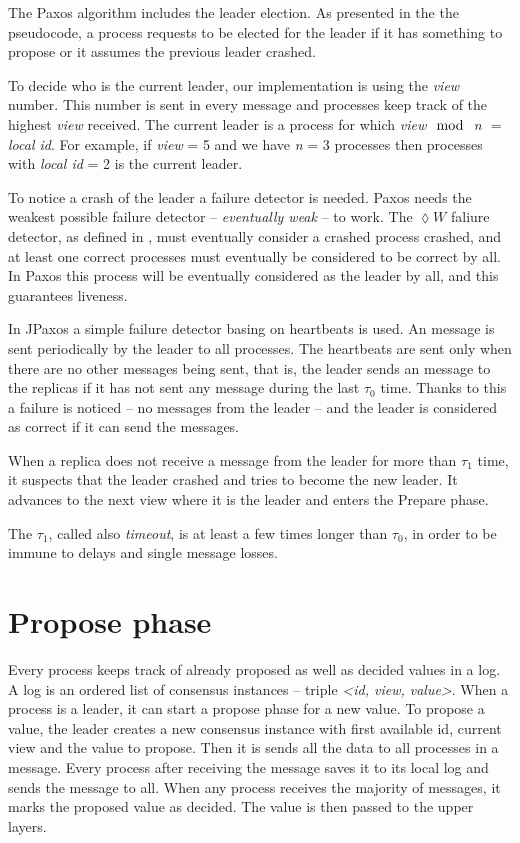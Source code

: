 The Paxos algorithm includes the leader election. As presented in the the pseudocode, a process requests to be elected for the leader if it has something to propose or it assumes the previous leader crashed.

To decide who is the current leader, our implementation is using the \textit{view} number. This number is sent in every message and processes keep track of the highest \textit{view} received. The current leader is a process for which \textit{view $\mod$ n $=$ local id}. For example, if \textit{view} = 5 and we have \textit{n} = 3 processes then processes with \textit{local id} = 2 is the current leader.

To notice a crash of the leader a failure detector is needed. Paxos needs the weakest possible failure detector -- \textit{eventually weak} -- to work. The $\lozenge W$ faliure detector, as defined in \cite{chandra1996unreliable}, must eventually consider a crashed process crashed, and at least one correct processes must eventually be considered to be correct by all. In Paxos this process will be eventually considered as the leader by all, and this guarantees liveness.

In JPaxos a simple failure detector basing on heartbeats is used. An \alive message is sent periodically by the leader to all processes. The heartbeats are sent only when there are no other messages being sent, that is, the leader sends an \alive message to the replicas if it has not sent any message during the last $\tau_0$ time. Thanks to this a failure is noticed -- no messages from the leader -- and the leader is considered as correct if it can send the messages.

When a replica does not receive a message from the leader for more than $\tau_1$ time, it suspects that the leader crashed and tries to become the new leader. It advances to the next view where it is the leader and enters the Prepare phase.

The $\tau_1$, called also \textit{timeout}, is at least a few times longer than $\tau_0$, in order to be immune to delays and single message losses.


\section{Propose phase} 

Every process keeps track of already proposed as well as decided values in a log. A log is an ordered list of consensus instances -- triple \textit{<id, view, value>}. When a process is a leader, it can start a propose phase for a new value. To propose a value, the leader creates a new consensus instance with first available id, current view and the value to propose. Then it is sends all the data to all processes in a \propose message. Every process after receiving the \propose message saves it to its local log and sends the \accept message to all. When any process receives the majority of \accept messages, it marks the proposed value as decided. The value is then passed to the upper layers.

